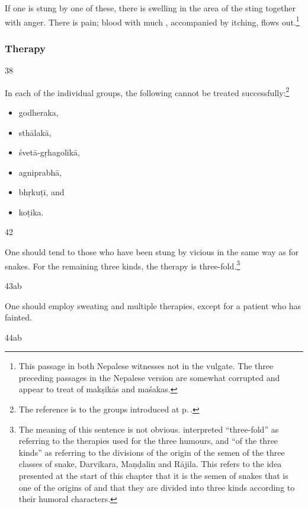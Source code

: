 \begin{translation}
If one is stung by one of these, there is swelling in the area of the sting together 
with anger. 
There is pain; blood with much , accompanied by
itching, flows out.\footnote{This passage in both Nepalese witnesses
    not in the vulgate.  The three preceding passages in the
    Nepalese version are somewhat corrupted and appear to treat of
    \glspl{makṣikā} and \glspl{maśaka}.}
    
 
\subsubsection{Therapy}

\item[38]

In each of the individual groups, the following cannot be treated 
successfully:\footnote{The reference is to the groups introduced at 
p.\,\pageref{ekajati}.}
\begin{itemize}
    \item \Gls{godheraka},
    \item \Gls{sthālakā}, 
    \item \Gls{śvetā-gṛhagolikā},
    \item \Gls{agniprabhā},
    \item \Gls{bhṛkuṭī}, 
    and
    \item \Gls{koṭika}.
    \end{itemize}

\item[42]

One should tend to those who have been stung by vicious
 in the same way as for snakes. For the remaining
three kinds, the therapy is three-fold.\footnote{The meaning of this
    sentence is not obvious.   interpreted
    “three-fold” as referring to the therapies used for the three humours,
    and “of the three kinds” as referring to the divisions of the origin
    of the semen of the three classes of snake, Darvīkara, Maṇḍalin and
    Rājila.  This refers to the idea presented at the start of this
    chapter that it is the semen of snakes that is one of the origins of
     and that they are divided into three kinds
    according to their humoral characters.}


\item[43ab]

One should employ sweating and multiple therapies, except for a patient who has 
fainted. 

\item[44ab]


\end{translation}
